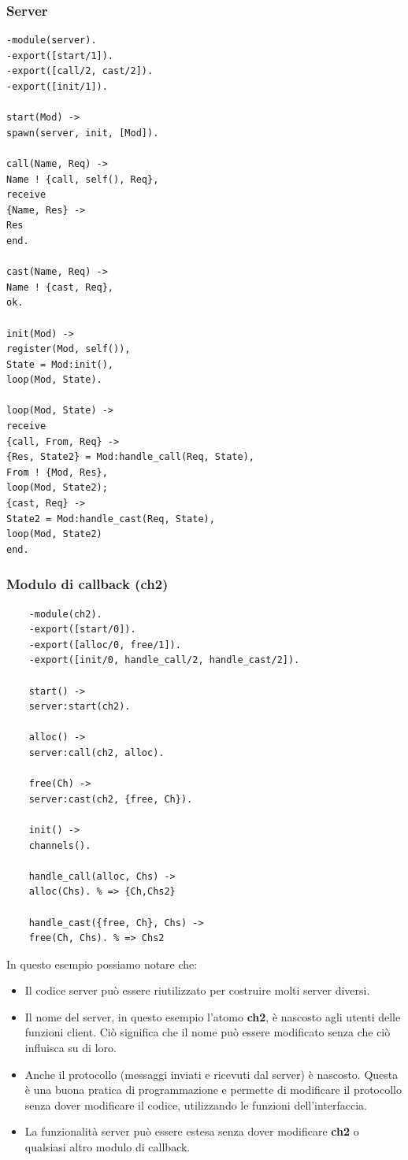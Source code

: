 \subsubsection{Server}
\begin{verbatim}
-module(server).
-export([start/1]).
-export([call/2, cast/2]).
-export([init/1]).

start(Mod) ->
spawn(server, init, [Mod]).

call(Name, Req) ->
Name ! {call, self(), Req},
receive
{Name, Res} ->
Res
end.

cast(Name, Req) ->
Name ! {cast, Req},
ok.

init(Mod) ->
register(Mod, self()),
State = Mod:init(),
loop(Mod, State).

loop(Mod, State) ->
receive
{call, From, Req} ->
{Res, State2} = Mod:handle_call(Req, State),
From ! {Mod, Res},
loop(Mod, State2);
{cast, Req} ->
State2 = Mod:handle_cast(Req, State),
loop(Mod, State2)
end.
\end{verbatim}

\subsubsection{Modulo di callback (ch2)}
\begin{verbatim}
	-module(ch2).
	-export([start/0]).
	-export([alloc/0, free/1]).
	-export([init/0, handle_call/2, handle_cast/2]).
	
	start() ->
	server:start(ch2).
	
	alloc() ->
	server:call(ch2, alloc).
	
	free(Ch) ->
	server:cast(ch2, {free, Ch}).
	
	init() ->
	channels().
	
	handle_call(alloc, Chs) ->
	alloc(Chs). % => {Ch,Chs2}
	
	handle_cast({free, Ch}, Chs) ->
	free(Ch, Chs). % => Chs2
\end{verbatim}

In questo esempio possiamo notare che:
\begin{itemize}
	\item Il codice server pu\`o essere riutilizzato per costruire molti server diversi.
	\item Il nome del server, in questo esempio l'atomo \textbf{ch2}, \`e nascosto agli utenti delle funzioni client. Ci\`o significa che il nome pu\`o essere modificato senza che ci\`o influisca su di loro.
	\item Anche il protocollo (messaggi inviati e ricevuti dal server) \`e nascosto. Questa \`e una buona pratica di programmazione e permette di modificare il protocollo senza dover modificare il codice, utilizzando le funzioni dell'interfaccia.
	\item La funzionalit\`a server pu\`o essere estesa senza dover modificare \textbf{ch2} o qualsiasi altro modulo di callback.
\end{itemize}

